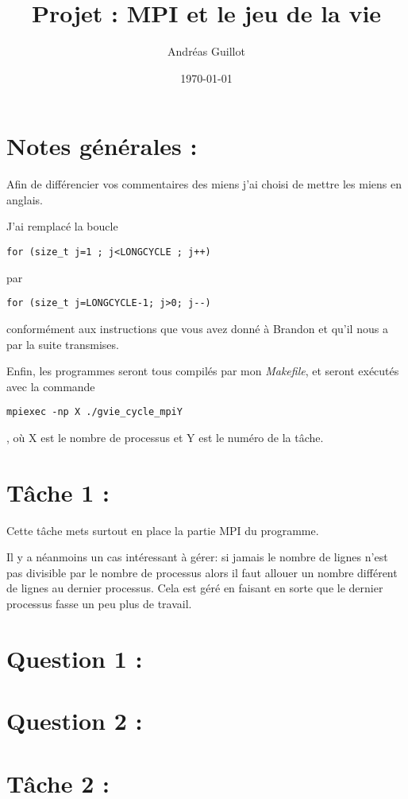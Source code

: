 \documentclass{article}
\title{Projet : MPI et le jeu de la vie}
\author{Andréas Guillot}
\date{\today}
\begin{document}
\maketitle

\section*{Notes générales :}

Afin de différencier vos commentaires des miens j'ai choisi de mettre les miens en anglais.

J'ai remplacé la boucle
\begin{verbatim}
for (size_t j=1 ; j<LONGCYCLE ; j++)
\end{verbatim} par \begin{verbatim}
for (size_t j=LONGCYCLE-1; j>0; j--)
\end{verbatim} conformément aux instructions que vous avez donné à Brandon et qu'il nous a par la suite transmises.

Enfin, les programmes seront tous compilés par mon \textit{Makefile}, et seront exécutés avec la commande \begin{verbatim}
mpiexec -np X ./gvie_cycle_mpiY
\end{verbatim}, où X est le nombre de processus et Y est le numéro de la tâche.

\section*{Tâche 1 :}

Cette tâche mets surtout en place la partie MPI du programme.

\medskip

Il y a néanmoins un cas intéressant à gérer: si jamais le nombre de lignes n'est pas divisible par le nombre de processus alors il faut allouer un nombre différent de lignes au dernier processus.
Cela est géré en faisant en sorte que le dernier processus fasse un peu plus de travail.

\section*{Question 1 :}
\section*{Question 2 :}
\section*{Tâche 2 :}
\end{document}
